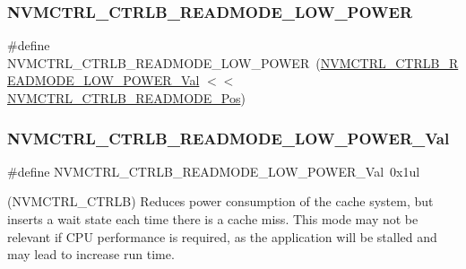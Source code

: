 \subsubsection{\texorpdfstring{NVMCTRL\_CTRLB\_READMODE\_LOW\_POWER}{NVMCTRL\_CTRLB\_READMODE\_LOW\_POWER}}
{\footnotesize\ttfamily \#define N\+V\+M\+C\+T\+R\+L\+\_\+\+C\+T\+R\+L\+B\+\_\+\+R\+E\+A\+D\+M\+O\+D\+E\+\_\+\+L\+O\+W\+\_\+\+P\+O\+W\+ER~(\mbox{\hyperlink{group___s_a_m_d21___n_v_m_c_t_r_l_gaa992cf03ba51b466d0e1f18fba2982d2}{N\+V\+M\+C\+T\+R\+L\+\_\+\+C\+T\+R\+L\+B\+\_\+\+R\+E\+A\+D\+M\+O\+D\+E\+\_\+\+L\+O\+W\+\_\+\+P\+O\+W\+E\+R\+\_\+\+Val}} $<$$<$ \mbox{\hyperlink{group___s_a_m_d21___n_v_m_c_t_r_l_ga46b5014db97bf5ce4da54dce52d162f9}{N\+V\+M\+C\+T\+R\+L\+\_\+\+C\+T\+R\+L\+B\+\_\+\+R\+E\+A\+D\+M\+O\+D\+E\+\_\+\+Pos}})}

\mbox{\label{group___s_a_m_d21___n_v_m_c_t_r_l_gaa992cf03ba51b466d0e1f18fba2982d2}} 
\subsubsection{\texorpdfstring{NVMCTRL\_CTRLB\_READMODE\_LOW\_POWER\_Val}{NVMCTRL\_CTRLB\_READMODE\_LOW\_POWER\_Val}}
{\footnotesize\ttfamily \#define N\+V\+M\+C\+T\+R\+L\+\_\+\+C\+T\+R\+L\+B\+\_\+\+R\+E\+A\+D\+M\+O\+D\+E\+\_\+\+L\+O\+W\+\_\+\+P\+O\+W\+E\+R\+\_\+\+Val~0x1ul}



(N\+V\+M\+C\+T\+R\+L\+\_\+\+C\+T\+R\+LB) Reduces power consumption of the cache system, but inserts a wait state each time there is a cache miss. This mode may not be relevant if C\+PU performance is required, as the application will be stalled and may lead to increase run time. 

\mbox{\label{group___s_a_m_d21___n_v_m_c_t_r_l_ga1a5b8a600e2d62a49984a1c75ea693a2}} 
